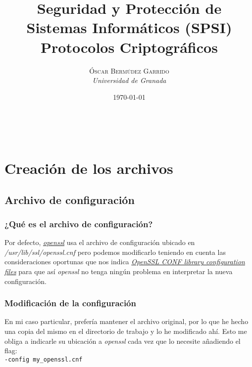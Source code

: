 \documentclass[a4paper, 11pt]{article}
\title{\textbf{Seguridad y Protección de Sistemas Informáticos (SPSI)}\\ %
Protocolos Criptográficos} %
\author{\textsc{Óscar Bermúdez Garrido} %
\\{\textit{Universidad de Granada}}} %
\date{\today} %
\makeatletter
\renewcommand{\maketitle}{
  \begin{flushright} %
  
  {\LARGE\@title} %
  
  \vspace{50pt} %
  
  {\large\@author} %
  \\\@date %
  \vspace{40pt} %
  \end{flushright}
}
\makeatother
\begin{document}
\maketitle %

\renewcommand{\abstractname}{Resumen} %

{\parskip=2pt
  \tableofcontents
}
\pagebreak


\section{Creación de los archivos}
	\subsection{Archivo de configuración}
		\subsubsection{¿Qué es el archivo de configuración?}
			Por defecto, \href{http://manpages.ubuntu.com/manpages/zesty/en/man1/openssl.1ssl.html}{\textit{openssl}} usa el
			archivo de configuración ubicado en \textit{/usr/lib/ssl/openssl.cnf} pero podemos modificarlo teniendo en cuenta
			las consideraciones oportunas que nos indica \href{https://www.openssl.org/docs/man1.0.2/apps/config.html}
			{\textit{OpenSSL CONF library configuration files}} para que así \textit{openssl} no tenga ningún problema en
			interpretar la nueva configuración.
			
		\subsubsection{Modificación de la configuración}
			En mi caso particular, prefería mantener el archivo original, por lo que he hecho una copia del mismo en el
			directorio de trabajo y lo he modificado ahí. Esto me obliga a indicarle su ubicación a \textit{openssl} cada
			vez que lo necesite añadiendo el flag:\\
			\verb|-config my_openssl.cnf|\\
		
\end{document}

